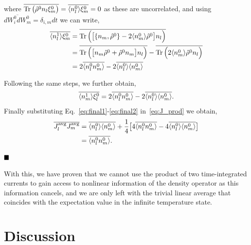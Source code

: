 where $\overline{\Tr\big( \hat{\rho}^0 n_l \xi_m^0 \big)} = \overline{\langle n_l^0\rangle \xi_m^0} = 0$ as these are uncorrelated, and using $\overline{dW_i^0 dW_m^0} = \delta_{i, m} dt$ we can write,
\begin{align}
\begin{split}
\label{eq:final1}
    \overline{\langle n_l^1\rangle \xi_m^0} &= \overline{\Tr\Big( \big[ \{n_m, \hat{\rho}^0\} - 2\langle n_m^0\rangle \hat{\rho}^0 \big]   n_l \Big)} \\
    &= \overline{\Tr\Big( \big[ n_m \hat{\rho}^0 + \hat{\rho}^0 n_m \big] n_l \Big)} - \overline{\Tr\Big( 2\langle n_m^0\rangle \hat{\rho}^0 n_l \Big)} \\
    &= 2\overline{\langle n_l^0 n_m^0\rangle} -2 \overline{\langle n_l^0\rangle\langle n_m^0\rangle}
\end{split}
\end{align}

Following the same steps, we further obtain, 
\begin{equation}
\label{eq:final2}
    \overline{\langle n_m^1\rangle \xi_l^0} = 2\overline{\langle n_l^0 n_m^0\rangle} -2 \overline{\langle n_l^0\rangle\langle n_m^0\rangle}.
\end{equation}
Finally substituting Eq.~\ref{eq:final1}-\ref{eq:final2} in~\ref{eq:J_prod} we obtain, 
\begin{align}
\begin{split}
        \overline{J_l^\text{avg} J_m^\text{avg}} &= \overline{\langle n_l^0\rangle \langle n_m^0\rangle } + \frac{1}{4} \big[ 4\overline{\langle n_l^0 n_m^0\rangle} -4 \overline{\langle n_l^0\rangle\langle n_m^0\rangle} \big] \\
    &= \overline{\langle n_l^0 n_m^0\rangle}. 
\end{split}
\end{align}

$\hfill\blacksquare$

With this, we have proven that we cannot use the product of two time-integrated currents to gain access to nonlinear information of the density operator as this information cancels, and we are only left with the trivial linear average that coincides with the expectation value in the infinite temperature state. 

\section{Discussion}

